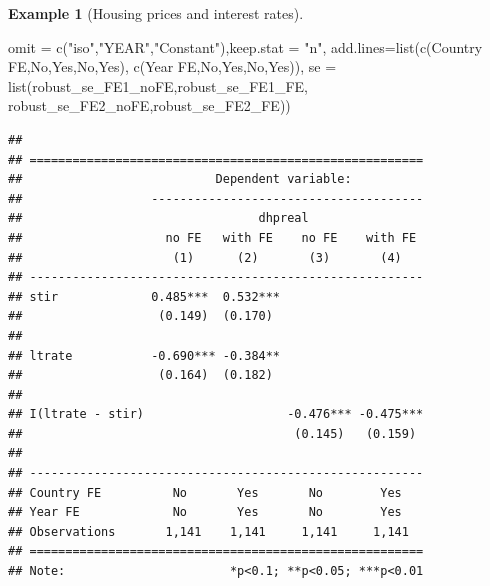 \documentclass[
  12pt,
]{book}
\newenvironment{Shaded}{\begin{snugshade}}{\end{snugshade}}
\newcommand{\AttributeTok}[1]{\textcolor[rgb]{0.77,0.63,0.00}{#1}}
\newcommand{\FunctionTok}[1]{\textcolor[rgb]{0.00,0.00,0.00}{#1}}
\newcommand{\NormalTok}[1]{#1}
\newcommand{\StringTok}[1]{\textcolor[rgb]{0.31,0.60,0.02}{#1}}
\theoremstyle{definition}
\theoremstyle{definition}
\newtheorem{example}{Example}[chapter]
\theoremstyle{definition}
\theoremstyle{definition}
\theoremstyle{remark}
\begin{document}
\begin{example}[Housing prices and interest rates]
\begin{Shaded}
\begin{Highlighting}[]
                     \AttributeTok{omit =} \FunctionTok{c}\NormalTok{(}\StringTok{"iso"}\NormalTok{,}\StringTok{"YEAR"}\NormalTok{,}\StringTok{"Constant"}\NormalTok{),}\AttributeTok{keep.stat =} \StringTok{"n"}\NormalTok{,}
                     \AttributeTok{add.lines=}\FunctionTok{list}\NormalTok{(}\FunctionTok{c}\NormalTok{(}\StringTok{\textquotesingle{}Country FE\textquotesingle{}}\NormalTok{,}\StringTok{\textquotesingle{}No\textquotesingle{}}\NormalTok{,}\StringTok{\textquotesingle{}Yes\textquotesingle{}}\NormalTok{,}\StringTok{\textquotesingle{}No\textquotesingle{}}\NormalTok{,}\StringTok{\textquotesingle{}Yes\textquotesingle{}}\NormalTok{),}
                                    \FunctionTok{c}\NormalTok{(}\StringTok{\textquotesingle{}Year FE\textquotesingle{}}\NormalTok{,}\StringTok{\textquotesingle{}No\textquotesingle{}}\NormalTok{,}\StringTok{\textquotesingle{}Yes\textquotesingle{}}\NormalTok{,}\StringTok{\textquotesingle{}No\textquotesingle{}}\NormalTok{,}\StringTok{\textquotesingle{}Yes\textquotesingle{}}\NormalTok{)),}
                     \AttributeTok{se =} \FunctionTok{list}\NormalTok{(robust\_se\_FE1\_noFE,robust\_se\_FE1\_FE,}
\NormalTok{                               robust\_se\_FE2\_noFE,robust\_se\_FE2\_FE))}
\end{Highlighting}
\end{Shaded}

\begin{verbatim}
## 
## =======================================================
##                           Dependent variable:          
##                  --------------------------------------
##                                 dhpreal                
##                    no FE   with FE    no FE    with FE 
##                     (1)      (2)       (3)       (4)   
## -------------------------------------------------------
## stir             0.485***  0.532***                    
##                   (0.149)  (0.170)                     
##                                                        
## ltrate           -0.690*** -0.384**                    
##                   (0.164)  (0.182)                     
##                                                        
## I(ltrate - stir)                    -0.476*** -0.475***
##                                      (0.145)   (0.159) 
##                                                        
## -------------------------------------------------------
## Country FE          No       Yes       No        Yes   
## Year FE             No       Yes       No        Yes   
## Observations       1,141    1,141     1,141     1,141  
## =======================================================
## Note:                       *p<0.1; **p<0.05; ***p<0.01
\end{verbatim}

\end{example}
\end{document}
